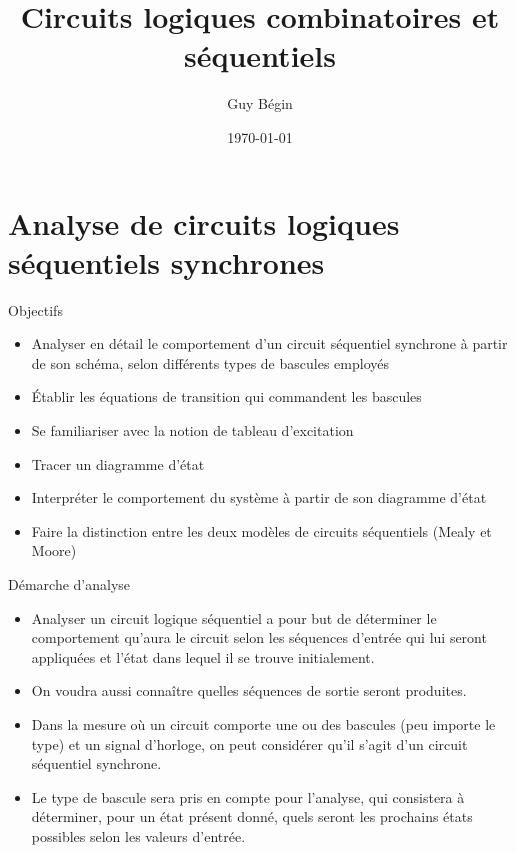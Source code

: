 \documentclass[presentation]{beamer}
\author{Guy Bégin}
\date{\today}
\title{Circuits logiques combinatoires et séquentiels}
\begin{document}
\maketitle

\section{Analyse de circuits logiques séquentiels synchrones}
\label{sec:org8ec86c6}
\begin{frame}[label={sec:org141cf39}]{Objectifs}
\begin{itemize}
\item Analyser en détail le comportement d'un circuit séquentiel
synchrone à partir de son schéma, selon différents types de bascules
employés
\item Établir les équations de transition qui commandent les bascules
\item Se familiariser avec la notion de tableau d'excitation
\item Tracer un diagramme d'état
\item Interpréter le comportement du système à partir de son
diagramme d'état
\item Faire la distinction entre les deux modèles de circuits séquentiels
(Mealy et Moore)
\end{itemize}
\end{frame}

\begin{frame}[label={sec:orge130da3}]{Démarche d'analyse}
\begin{itemize}
\item Analyser un circuit logique séquentiel a pour but de déterminer le comportement qu'aura le circuit selon les séquences d'entrée qui lui seront appliquées et l'état dans lequel il se trouve initialement.

\item On voudra aussi connaître quelles séquences de sortie seront produites.

\item Dans la mesure où un circuit comporte une ou des bascules (peu importe le type) et un signal d'horloge, on peut considérer qu'il s'agit d'un circuit séquentiel synchrone.

\item Le type de bascule sera pris en compte pour l'analyse, qui consistera à déterminer, pour un état présent donné, quels seront les prochains états possibles selon les valeurs d'entrée.
\end{itemize}
\end{frame}
\end{document}
